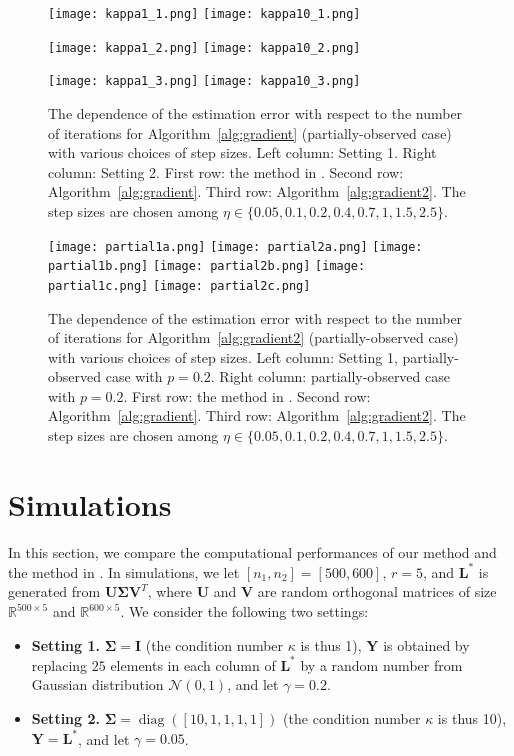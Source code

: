 \documentclass[12pt]{article}
\newcommand{\diag}{\operatorname{diag}}
\newcommand{\bL}{\boldsymbol{L}}
\newcommand{\bSigma}{\boldsymbol\Sigma}
\newcommand{\bU}{\boldsymbol{U}}
\newcommand{\bV}{\boldsymbol{V}}
\def\reals{\mathbb{R}}
\def\bSigma{\boldsymbol\Sigma}
\def\bU{\boldsymbol{U}}
\def\bY{\boldsymbol{Y}}
\def\bI{\mathbf{I}}
\theoremstyle{plain}
\theoremstyle{definition}
\theoremstyle{plain}
\theoremstyle{plain}
\theoremstyle{remark}
\begin{document}
\begin{figure}
\centering
\texttt{[image: kappa1\_1.png]}
\texttt{[image: kappa10\_1.png]}

\centering
\texttt{[image: kappa1\_2.png]}
\texttt{[image: kappa10\_2.png]}

\centering
\texttt{[image: kappa1\_3.png]}
\texttt{[image: kappa10\_3.png]}
\caption{The dependence of the estimation error with respect to the number of iterations for Algorithm~\ref{alg:gradient} (partially-observed case) with various choices of step sizes. Left column: Setting 1. Right column: Setting 2. First row: the method in \cite{DBLP:conf/nips/YiPCC16}. Second row: Algorithm~\ref{alg:gradient}. Third row: Algorithm~\ref{alg:gradient2}. The step sizes are chosen among $\eta \in \{0.05,0.1,0.2,0.4,0.7,1,1.5,2.5\}$.}\label{fig:DD1}
\end{figure}

\begin{figure}
\centering
\texttt{[image: partial1a.png]}
\texttt{[image: partial2a.png]}
\centering
\texttt{[image: partial1b.png]}
\texttt{[image: partial2b.png]}
\centering
\texttt{[image: partial1c.png]}
\texttt{[image: partial2c.png]}

\caption{The dependence of the estimation error with respect to the number of iterations for Algorithm~\ref{alg:gradient2} (partially-observed case) with various choices of step sizes. Left column: Setting 1, partially-observed case with $p=0.2$. Right column: partially-observed case with $p=0.2$. First row: the method in \cite{DBLP:conf/nips/YiPCC16}. Second row: Algorithm~\ref{alg:gradient}. Third row: Algorithm~\ref{alg:gradient2}. The step sizes are chosen among $\eta \in \{0.05,0.1,0.2,0.4,0.7,1,1.5,2.5\}$.}\label{fig:DD2}
\end{figure}
 
\section{Simulations}\label{sec:simu}
In this section, we compare the computational performances of our method and the method in \cite{DBLP:conf/nips/YiPCC16}. In  simulations, we let $[n_1,n_2]=[500,600]$, $r=5$, and $\bL^*$ is generated from $\bU\bSigma\bV^T$, where $\bU$ and $\bV$ are random orthogonal matrices of size $\reals^{500\times 5}$ and $\reals^{600\times 5}$. We consider the following two settings:
\begin{itemize}
\item \textbf{Setting 1.} $\bSigma=\bI$ (the condition number $\kappa$ is thus 1), $\bY$ is obtained by replacing $25$ elements in each column of $\bL^*$ by a random number from Gaussian distribution $\mathcal{N}(0,1)$, and let $\gamma=0.2$. 
\item \textbf{Setting 2.}  $\bSigma=\diag([10,1,1,1,1])$ (the condition number $\kappa$ is thus 10), $\bY=\bL^{*}$, and let $\gamma=0.05$.
\end{itemize}
\end{document}
